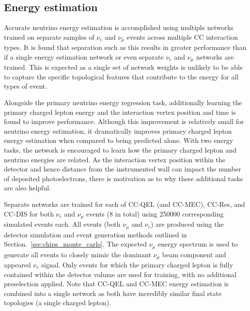 \subsection{Energy estimation} %
\label{sec:cnn_specific_energy} %

Accurate neutrino energy estimation is accomplished using multiple networks trained on separate
samples of $\nu_{e}$ and $\nu_{\mu}$ events across multiple CC interaction types. It is found that
separation such as this results in greater performance than if a single energy estimation network
or even separate $\nu_{e}$ and $\nu_{\mu}$ networks are trained. This is expected as a single set
of network weights is unlikely to be able to capture the specific topological features that
contribute to the energy for all types of event.

Alongside the primary neutrino energy regression task, additionally learning the primary charged
lepton energy and the interaction vertex position and time is found to improve performance.
Although this improvement is relatively small for neutrino energy estimation, it dramatically
improves primary charged lepton energy estimation when compared to being predicted alone. With two
energy tasks, the network is encouraged to learn how the primary charged lepton and neutrino
energies are related. As the interaction vertex position within the detector and hence distance
from the instrumented wall can impact the number of deposited photoelectrons, there is motivation
as to why these additional tasks are also helpful.

Separate networks are trained for each of CC-QEL (and CC-MEC), CC-Res, and CC-DIS for both
$\nu_{e}$ and $\nu_{\mu}$ events (8 in total) using 250000 corresponding simulated events each.
All events (both $\nu_{\mu}$ and $\nu_{e}$) are produced using the detector simulation and event
generation methods outlined in Section.~\ref{sec:chips_monte_carlo}. The expected \chipsfive
$\nu_{\mu}$ energy spectrum is used to generate all events to closely mimic the dominant
$\nu_{\mu}$ beam component and appeared $\nu_{e}$ signal. Only events for which the primary
charged lepton is fully contained within the detector volume are used for training, with no
additional preselection applied. Note that CC-QEL and CC-MEC energy estimation is combined into a
single network as both have incredibly similar final state topologies (a single charged lepton).

